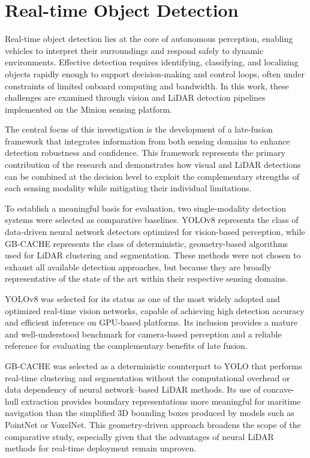 \documentclass{erauthesis}
\begin{document}
\chapter{Real-time Object Detection} \label{realtime_object_detection}

Real-time object detection lies at the core of autonomous perception, enabling vehicles to interpret their surroundings and respond safely to dynamic environments.
Effective detection requires identifying, classifying, and localizing objects rapidly enough to support decision-making and control loops, often under constraints of limited onboard computing and bandwidth.
In this work, these challenges are examined through vision and LiDAR detection pipelines implemented on the Minion sensing platform.

The central focus of this investigation is the development of a late-fusion framework that integrates information from both sensing domains to enhance detection robustness and confidence.
This framework represents the primary contribution of the research and demonstrates how visual and LiDAR detections can be combined at the decision level to exploit the complementary strengths of each sensing modality while mitigating their individual limitations.

To establish a meaningful basis for evaluation, two single-modality detection systems were selected as comparative baselines.
YOLOv8 represents the class of data-driven neural network detectors optimized for vision-based perception, while GB-CACHE represents the class of deterministic, geometry-based algorithms used for LiDAR clustering and segmentation.
These methods were not chosen to exhaust all available detection approaches, but because they are broadly representative of the state of the art within their respective sensing domains.

YOLOv8 was selected for its status as one of the most widely adopted and optimized real-time vision networks, capable of achieving high detection accuracy and efficient inference on GPU-based platforms.
Its inclusion provides a mature and well-understood benchmark for camera-based perception and a reliable reference for evaluating the complementary benefits of late fusion.

GB-CACHE was selected as a deterministic counterpart to YOLO that performs real-time clustering and segmentation without the computational overhead or data dependency of neural network–based LiDAR methods.
Its use of concave-hull extraction provides boundary representations more meaningful for maritime navigation than the simplified 3D bounding boxes produced by models such as PointNet or VoxelNet.
This geometry-driven approach broadens the scope of the comparative study, especially given that the advantages of neural LiDAR methods for real-time deployment remain unproven.
\end{document}
